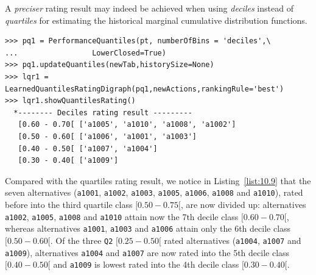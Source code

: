 A \emph{preciser} rating result may indeed be achieved when using \emph{deciles} instead of \emph{quartiles} for estimating the historical marginal cumulative distribution functions.
\begin{lstlisting}[caption={Absolute deciles rating result},label=list:10.9]
>>> pq1 = PerformanceQuantiles(pt, numberOfBins = 'deciles',\
...                 LowerClosed=True)
>>> pq1.updateQuantiles(newTab,historySize=None)
>>> lqr1 = LearnedQuantilesRatingDigraph(pq1,newActions,rankingRule='best')
>>> lqr1.showQuantilesRating()
  *-------- Deciles rating result ---------
   [0.60 - 0.70[ ['a1005', 'a1010', 'a1008', 'a1002']
   [0.50 - 0.60[ ['a1006', 'a1001', 'a1003']
   [0.40 - 0.50[ ['a1007', 'a1004']
   [0.30 - 0.40[ ['a1009']
\end{lstlisting}

Compared with the quartiles rating result, we notice in Listing~\vref{list:10.9} that the seven alternatives (\texttt{a1001}, \texttt{a1002}, \texttt{a1003}, \texttt{a1005}, \texttt{a1006}, \texttt{a1008} and \texttt{a1010}), rated before into the third quartile class $[0.50-0.75[$, are now divided up: alternatives \texttt{a1002}, \texttt{a1005}, \texttt{a1008} and \texttt{a1010} attain now the 7th decile class $[0.60-0.70[$, whereas alternatives \texttt{a1001}, \texttt{a1003} and \texttt{a1006} attain only the 6th decile class $[0.50-0.60[$. Of the three \texttt{Q2} $[0.25-0.50[$ rated alternatives (\texttt{a1004}, \texttt{a1007} and \texttt{a1009}), alternatives \texttt{a1004} and \texttt{a1007} are now rated into the 5th decile class $[0.40-0.50[$ and \texttt{a1009} is lowest rated into the 4th decile class $[0.30-0.40[$.

